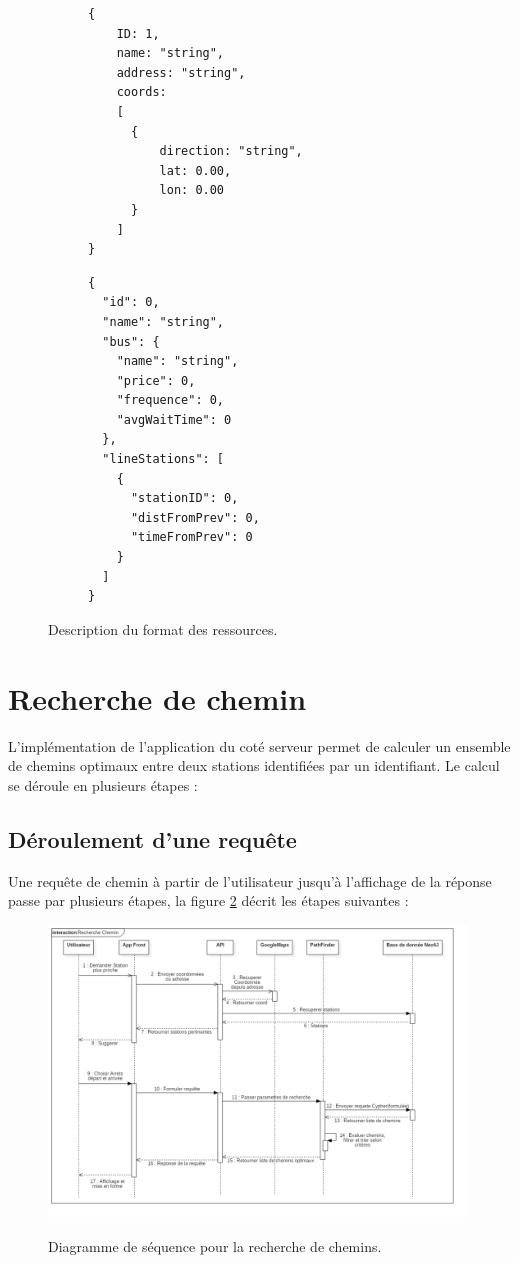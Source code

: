 \begin{figure}[h!]
	\begin{subfigure}[b]{0.45\linewidth}
		\begin{lstlisting}[caption=Format JSON de Station]
{
	ID: 1,
	name: "string",
	address: "string",
	coords: 
	[
	  {
	  	  direction: "string",
  		  lat: 0.00,
   		  lon: 0.00
	  }
	]
}
		\end{lstlisting}
	\end{subfigure}\hfill%
	\begin{subfigure}[b]{0.45\linewidth}
		\begin{lstlisting}[caption=Format JSON de Line]
{
  "id": 0,
  "name": "string",
  "bus": {
    "name": "string",
    "price": 0,
    "frequence": 0,
    "avgWaitTime": 0
  },
  "lineStations": [
    {
      "stationID": 0,
      "distFromPrev": 0,
      "timeFromPrev": 0
    }
  ]
}
		\end{lstlisting}
	\end{subfigure}\hfill%
	\caption{Description du format des ressources.}
	\label{fig:formatResources}
\end{figure}

\section{Recherche de chemin}
L'implémentation de l'application du coté serveur permet de calculer un ensemble de chemins optimaux entre deux stations identifiées par un identifiant. Le calcul se déroule en plusieurs étapes :
\subsection{Déroulement d'une requête}

Une requête de chemin à partir de l'utilisateur jusqu'à l'affichage de la réponse passe par plusieurs étapes, la figure \ref{fig:diagSequence} décrit les étapes suivantes :
\begin{figure}[h!]
	\center
	\includegraphics[width=0.99\textwidth]{img/RechercheChemin.png}
	\label{fig:diagSequence}
	\caption{Diagramme de séquence pour la recherche de chemins.}
\end{figure}


